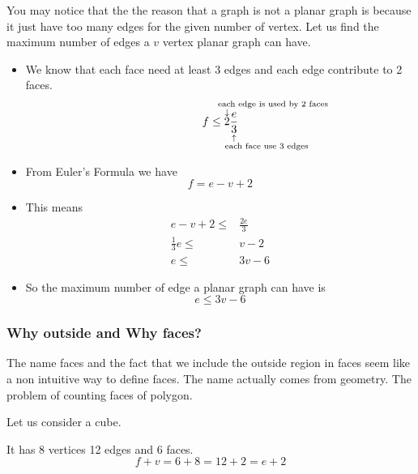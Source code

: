 \documentclass[a4paper, 12pt]{article}
\newcommand{\expl}[2]{%
	\underset{\substack{\uparrow\\\mathrlap{\text{\hspace{-1em}#2}}}}{#1}}
\newcommand{\uexpl}[2]{%
	\overset{\substack{\mathrlap{\text{\hspace{-1em}#2}}\\\downarrow}}{#1}}
\begin{document}
	You may notice that the the reason that a graph is not a planar graph is because it just have too many edges for the given number of vertex. Let us find the maximum number of edges a $v$ vertex planar graph can have.
	
	\begin{itemize}
		\item We know that each face need at least 3 edges and each edge contribute to 2 faces.
		\[
			f \le \uexpl{2}{each edge is used by 2 faces}\frac{e}{\expl{3}{each face use 3 edges}}
		\]
		\item From Euler's Formula we have
		\[
			f = e-v+2
		\]
		\item This means
		\begin{align*}
			e - v + 2 \le& \frac{2e}{3}\\
			\frac{1}{3}e \le& v -2\\
			e \le& 3v - 6
		\end{align*}
		
		\item So the maximum number of edge a planar graph can have is
		\[
		e \le 3v - 6
		\]
	\end{itemize}
	
	\subsubsection*{Why outside and Why faces?}
	The name faces and the fact that we include the outside region in faces seem like a non intuitive way to define faces. The name actually comes from geometry. The problem of counting faces of polygon.
	
	Let us consider a cube.
	\begin{center}
	\end{center}
	It has 8 vertices 12 edges and 6 faces.
	\[
		f+v = 6+8 = 12 +2 = e+2
	\]
	
\end{document}
